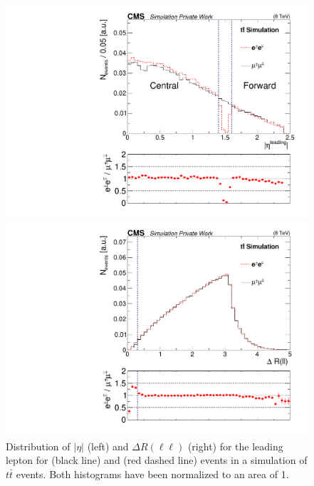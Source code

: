 \begin{figure}[htbp]
\centering
\begin{minipage}[t]{0.49\textwidth}
  \includegraphics[width=\textwidth]{plots/SELECTION/gapJustification.pdf}
\end{minipage}
\begin{minipage}[t]{0.49\textwidth}
\includegraphics[width=\textwidth]{plots/SELECTION/dRJustification_eeVSmm.pdf}
\end{minipage}
\caption{Distribution of $|\eta|$ (left) and $\Delta R(\ell\ell)$ (right) for the leading lepton for \MM (black line) and \EE (red dashed line) events in a simulation of $t\bar{t}$ events. Both histograms have been normalized to an area of 1.}
\label{fig:cutJustification}
\end{figure}    

